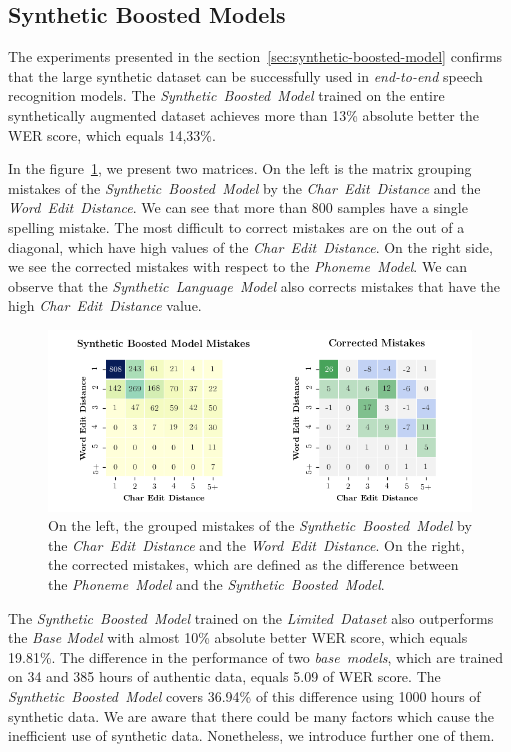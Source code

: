 \subsection*{Synthetic Boosted Models}

The experiments presented in the section~\ref{sec:synthetic-boosted-model} confirms
that the large synthetic dataset can be successfully used in \textit{end-to-end} speech recognition models.
The \textit{Synthetic~Boosted~Model} trained on the entire synthetically augmented
dataset achieves more than 13\% absolute better the WER score, which equals 14,33\%.

In the figure~\ref{fig:synthetic-lm-improvements}, we present two matrices.
On the left is the matrix grouping mistakes of the \textit{Synthetic~Boosted~Model}
by the \textit{Char~Edit~Distance} and the \textit{Word~Edit~Distance}.
We can see that more than 800 samples have a single spelling mistake.
The most difficult to correct mistakes are on the out of a diagonal, which have
high values of the \textit{Char~Edit~Distance}.
On the right side, we see the corrected mistakes
with respect to the \textit{Phoneme~Model}.
We can observe that the \textit{Synthetic~Language~Model} also corrects mistakes
that have the high \textit{Char~Edit~Distance} value.

\begin{figure}[h]
    \centering
    \includegraphics[width=1\textwidth]{figures/experiments-synthetic-lm-improvements.png}
    \caption{
On the left, the grouped mistakes of the \textit{Synthetic~Boosted~Model} by
the \textit{Char~Edit~Distance} and the \textit{Word~Edit~Distance}.
On the right, the corrected mistakes, which are defined as the difference between
the \textit{Phoneme~Model} and the \textit{Synthetic~Boosted~Model}.
}
    \label{fig:synthetic-lm-improvements}
\end{figure}

The \textit{Synthetic~Boosted~Model} trained on the \textit{Limited~Dataset} also outperforms the \textit{Base Model}
with almost 10\% absolute better WER score, which equals 19.81\%.
The difference in the performance of two \textit{base~models},
which are trained on 34 and 385 hours of authentic data, equals 5.09 of WER score.
The \textit{Synthetic~Boosted~Model} covers 36.94\% of this difference using 1000 hours of synthetic data.
We are aware that there could be many factors which cause the inefficient use of synthetic data.
Nonetheless, we introduce further one of them.

